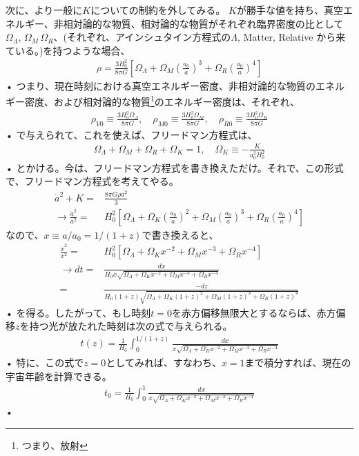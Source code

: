 \documentclass[11pt,a4paper,dvipdfmx]{jsarticle}
\theoremstyle{plain}
\theoremstyle{break}
\begin{document}
次に、より一般に$K$についての制約を外してみる。
$K$が勝手な値を持ち、真空エネルギー、非相対論的な物質、相対論的な物質がそれぞれ臨界密度の比として$\Omega_{\Lambda}, \, \Omega_{M} \, \Omega_{R}、$(それぞれ、アインシュタイン方程式の$\Lambda$, Matter, Relative から来ている。)を持つような場合、
\begin{align}
  \rho=\frac{3 H_{0}^{2}}{8 \pi G}\left[\Omega_{\Lambda}+\Omega_{M}\left(\frac{a_{0}}{a}\right)^{3}+\Omega_{R}\left(\frac{a_{0}}{a}\right)^{4}\right]
\end{align}•%
つまり、現在時刻における真空エネルギー密度、非相対論的な物質のエネルギー密度、および相対論的な物質\footnote{つまり、放射}のエネルギー密度は、それぞれ、
\begin{align}
  \rho_{V 0} \equiv \frac{3 H_{0}^{2} \Omega_{\Lambda}}{8 \pi G}, \quad \rho_{M 0} \equiv \frac{3 H_{0}^{2} \Omega_{M}}{8 \pi G}, \quad \rho_{R 0} \equiv \frac{3 H_{0}^{2} \Omega_{R}}{8 \pi G}
\end{align}•%
で与えられて、これを使えば、フリードマン方程式は、
\begin{align}
  \Omega_{\Lambda}+\Omega_{M}+\Omega_{R}+\Omega_{K}=1, \quad \Omega_{K} \equiv-\frac{K}{a_{0}^{2} H_{0}^{2}}
\end{align}•%
とかける。今は、フリードマン方程式を書き換えただけ。それで、この形式で、フリードマン方程式を考えてやる。
\begin{align}
  \dot{a}^2 + K =& \frac{8\pi G \rho a^2}{3}\\
  \rightarrow \frac{\dot{a}^2}{a^2} =& H_0^2  \left[ \Omega_{\Lambda} + \Omega_{K}\left(\frac{a_0}{a}\right)^2 + \Omega_{M} \left(\frac{a_0}{a}\right)^3 +\Omega_{R} \left(\frac{a_0}{a}\right)^4 \right]
\end{align}
なので、$x \equiv a/a_0 = 1/(1+z)$で書き換えると、
\begin{align}
    \frac{\dot{x}^2}{x^2} 
      =&H_0^2  \left[ \Omega_{\Lambda} + \Omega_{K}x^{-2} + \Omega_{M} x^{-3} + \Omega_{R} x^{-4} \right]\\
    \rightarrow
    dt
      =& \frac{dx}{H_0 x \sqrt{ \Omega_{\Lambda} + \Omega_{K}x^{-2} + \Omega_{M} x^{-3} + \Omega_{R} x^{-4}  }}\\
      =&\frac{-d z}{H_{0}(1+z) \sqrt{\Omega_{\Lambda}+\Omega_{K}(1+z)^{2}+\Omega_{M}(1+z)^{3}+\Omega_{R}(1+z)^{4}}}
\end{align}•%
を得る。したがって、もし時刻$t=0$を赤方偏移無限大とするならば、赤方偏移$z$を持つ光が放たれた時刻は次の式で与えられる。
\begin{align}
  t(z)=\frac{1}{H_{0}} \int_{0}^{1 /(1+z)} \frac{d x}{x \sqrt{\Omega_{\Lambda}+\Omega_{K} x^{-2}+\Omega_{M} x^{-3}+\Omega_{R} x^{-4}}}
\end{align}•%
特に、この式で$z=0$としてみれば、すなわち、$x = 1$まで積分すれば、現在の宇宙年齢を計算できる。
\begin{align}
  t_{0}=\frac{1}{H_{0}} \int_{0}^{1} \frac{d x}{x \sqrt{\Omega_{\Lambda}+\Omega_{K} x^{-2}+\Omega_{M} x^{-3}+\Omega_{R} x^{-4}}}
\end{align}•%
\end{document}
